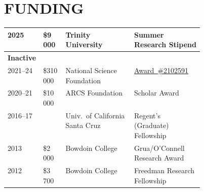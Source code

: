 \section{FUNDING}

\begin{tabular}{@{}p{.1\linewidth} p{0.1\linewidth} p{0.35\linewidth} @{}p{.4\linewidth}} 
    2025 & \$9\,000 & Trinity University & Summer Research Stipend\\
    \midrule
    \textbf{Inactive}\\
    2021--24 & \$310\,000 & National Science Foundation & \href{https://www.nsf.gov/awardsearch/showAward?AWD_ID=2102591}{Award~\#2102591}\\
    2020--21 & \$10\,000 & ARCS Foundation & Scholar Award \\
    2016--17 &  & Univ.~of California Santa Cruz  & Regent's (Graduate) Fellowship \\
    2013 & \$2\,000 & Bowdoin College & Grua/O'Connell Research Award  \\ 
    2012 & \$3\,700 & Bowdoin College & Freedman Research Fellowship \\
\end{tabular}